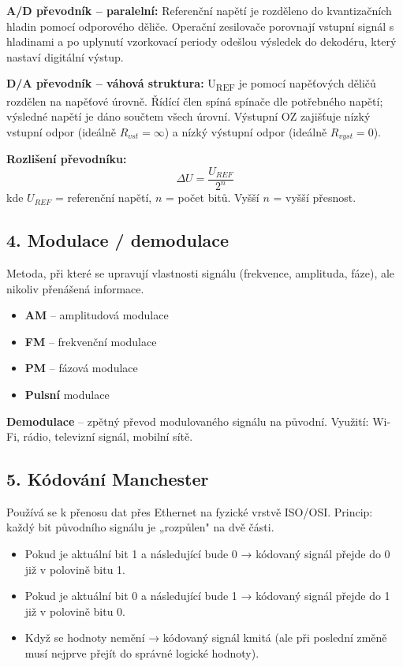 \documentclass[a4paper,10pt]{article}
\begin{document}
\begin{vysvetlenibox}
\begin{vzorcebox}
\textbf{A/D převodník – paralelní:}
Referenční napětí je rozděleno do kvantizačních hladin pomocí odporového děliče. Operační zesilovače porovnají vstupní signál s hladinami a po uplynutí vzorkovací periody odešlou výsledek do dekodéru, který nastaví digitální výstup.

\medskip
\textbf{D/A převodník – váhová struktura:}
U\textsubscript{REF} je pomocí napěťových děličů rozdělen na napěťové úrovně. Řídící člen spíná spínače dle potřebného napětí; výsledné napětí je dáno součtem všech úrovní. Výstupní OZ zajišťuje nízký vstupní odpor (ideálně $R_{vst} = \infty$) a nízký výstupní odpor (ideálně $R_{vyst} = 0$).

\medskip
\textbf{Rozlišení převodníku:}
\[
\Delta U = \frac{U_{REF}}{2^n}
\]
kde $U_{REF}$ = referenční napětí, $n$ = počet bitů. Vyšší $n$ = vyšší přesnost.
\end{vzorcebox}

\subsection*{4. Modulace / demodulace}

Metoda, při které se upravují vlastnosti signálu (frekvence, amplituda, fáze), ale nikoliv přenášená informace.

\begin{itemize}
  \item \textbf{AM} – amplitudová modulace
  \item \textbf{FM} – frekvenční modulace
  \item \textbf{PM} – fázová modulace
  \item \textbf{Pulsní} modulace
\end{itemize}
\textbf{Demodulace} – zpětný převod modulovaného signálu na původní. Využití: Wi-Fi, rádio, televizní signál, mobilní sítě.

\subsection*{5. Kódování Manchester}

Používá se k přenosu dat přes Ethernet na fyzické vrstvě ISO/OSI. Princip: každý bit původního signálu je „rozpůlen" na dvě části.

\begin{itemize}
  \item Pokud je aktuální bit 1 a následující bude 0 → kódovaný signál přejde do 0 již v polovině bitu 1.
  \item Pokud je aktuální bit 0 a následující bude 1 → kódovaný signál přejde do 1 již v polovině bitu 0.
  \item Když se hodnoty nemění → kódovaný signál kmitá (ale při poslední změně musí nejprve přejít do správné logické hodnoty).
\end{itemize}


\end{vysvetlenibox}
\end{document}
